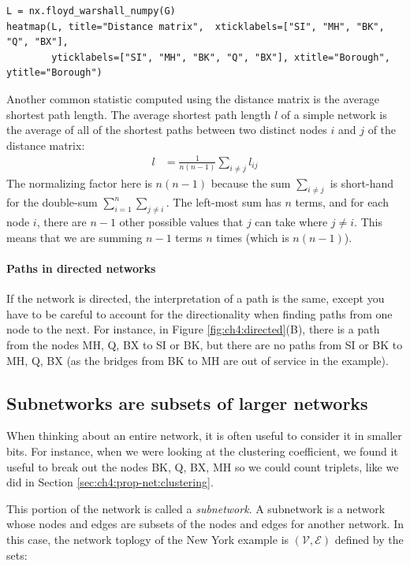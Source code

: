 \begin{lstlisting}[style=python]
L = nx.floyd_warshall_numpy(G)
heatmap(L, title="Distance matrix",  xticklabels=["SI", "MH", "BK", "Q", "BX"],
        yticklabels=["SI", "MH", "BK", "Q", "BX"], xtitle="Borough", ytitle="Borough")
\end{lstlisting}
Another common statistic computed using the distance matrix is the {average shortest path length}. The average shortest path length $l$ of a simple network is the average of all of the shortest paths between two distinct nodes $i$ and $j$ of the distance matrix:
\begin{align*}
    l &= \frac{1}{n(n - 1)}\sum_{i \neq j} l_{ij}
\end{align*}
The normalizing factor here is $n(n - 1)$ because the sum $\sum_{i \neq j}$ is short-hand for the double-sum $\sum_{i = 1}^n \sum_{j \neq i}$. The left-most sum has $n$ terms, and for each node $i$, there are $n-1$ other possible values that $j$ can take where $j \neq i$. This means that we are summing $n-1$ terms $n$ times (which is $n (n - 1)$). 

\paragraph{Paths in directed networks}

If the network is directed, the interpretation of a path is the same, except you have to be careful to account for the directionality when finding paths from one node to the next. For instance, in Figure \ref{fig:ch4:directed}(B), there {is} a path from the nodes MH, Q, BX to SI or BK, but there are {no} paths from SI or BK to MH, Q, BX (as the bridges from BK to MH are out of service in the example).

\subsection{Subnetworks are subsets of larger networks}
\label{sec:ch4:prop-net:subnetwork}
When thinking about an entire network, it is often useful to consider it in smaller bits. For instance, when we were looking at the clustering coefficient, we found it useful to break out the nodes {BK, Q, BX, MH} so we could count triplets, like we did in Section \ref{sec:ch4:prop-net:clustering}. 

This portion of the network is called a \textit{subnetwork}. A subnetwork is a network whose nodes and edges are {subsets} of the nodes and edges for another network. In this case, the  network toplogy of the New York example is $(\mathcal V, \mathcal E)$ defined by the sets:

